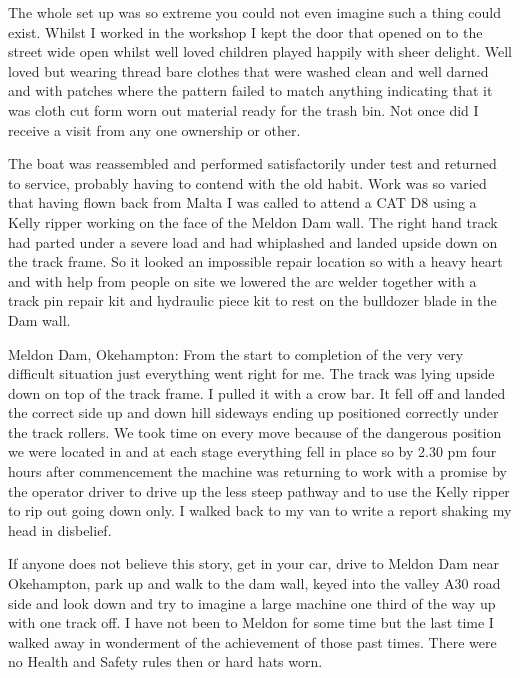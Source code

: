 
The whole set up was so extreme you could not even imagine such a thing could
exist. Whilst I worked in the workshop I kept the door that opened on to the
street wide open whilst well loved children played happily with sheer delight.
Well loved but wearing thread bare clothes that were washed clean and well
darned and with patches where the pattern failed to match anything indicating
that it was cloth cut form worn out material ready for the trash bin. Not once
did I receive a visit from any one ownership or other.

The boat was reassembled and performed satisfactorily under test and returned to
service, probably having to contend with the old habit. Work was so varied
that having flown back from Malta I was called to attend a CAT D8 using a Kelly
ripper working on the face of the Meldon Dam wall. The right hand track had
parted under a severe load and had whiplashed and landed upside down on the
track frame. So it looked an impossible repair location so with a heavy heart
and with help from people on site we lowered the arc welder together with a
track pin repair kit and hydraulic piece kit to rest on the bulldozer blade in
the Dam wall.

Meldon Dam, Okehampton: From the start to completion of the very very difficult
situation just everything went right for me. The track was lying upside down
on top of the track frame. I pulled it with a crow bar. It fell off and
landed the correct side up and down hill sideways ending up positioned
correctly under the track rollers. We took time on every move because of the
dangerous position we were located in and at each stage everything fell in
place so by 2.30 pm four hours after commencement the machine was returning to
work with a promise by the operator driver to drive up the less steep pathway
and to use the Kelly ripper to rip out going down only. I walked back to my
van to write a report shaking my head in disbelief.

If anyone does not believe this story, get in your car, drive to Meldon Dam near
Okehampton, park up and walk to the dam wall, keyed into the valley A30 road
side and look down and try to imagine a large machine one third of the way up
with one track off. I have not been to Meldon for some time but the last time I
walked away in wonderment of the achievement of those past times. There were
no Health and Safety rules then or hard hats worn.

